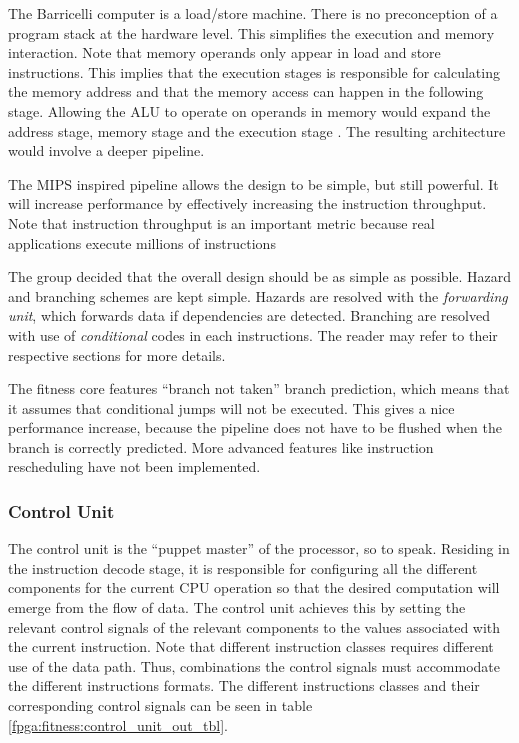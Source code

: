 The Barricelli computer is a load/store machine.
There is no preconception of a program stack at the hardware level.
This simplifies the execution and memory interaction.
Note that memory operands only appear in load and store instructions.
This implies that the execution stages is responsible for calculating the memory address and that the memory access can happen in the following stage.
Allowing the ALU to operate on operands in memory would expand the address stage, memory stage and the execution stage \cite[p.~335]{compOrgDes}.
The resulting architecture would involve a deeper pipeline. 


The MIPS inspired pipeline allows the design to be simple, but still powerful.
It  will increase performance by effectively increasing the instruction throughput.
Note that instruction throughput is an important metric because real applications execute millions of instructions \cite[p.~335]{compOrgDes}


The group decided that the overall design should be as simple as possible.
Hazard and branching schemes are kept simple.
Hazards are resolved with the \emph{forwarding unit}, which forwards data if dependencies are detected.
Branching are resolved with use of \emph{conditional} codes in each instructions.
The reader may refer to their respective sections for more details.

The fitness core features ``branch not taken'' branch prediction, which means that it assumes that conditional jumps will not be executed.
This gives a nice performance increase, because the pipeline does not have to be flushed when the branch is correctly predicted.
More advanced features like instruction rescheduling have not been implemented.

\newpage
\subsubsection{Control Unit} 

The control unit is the ``puppet master'' of the processor, so to speak.
Residing in the instruction decode stage, it is responsible for configuring all the different components for the current CPU operation so that the desired computation will emerge from the flow of data.
The control unit achieves this by setting the relevant control signals of the relevant components to the values associated with the current instruction.
Note that different instruction classes requires different use of the data path.
Thus, combinations the control signals must accommodate the different instructions formats. The different instructions classes and their corresponding control signals can be seen in table \ref{fpga:fitness:control_unit_out_tbl}. 

